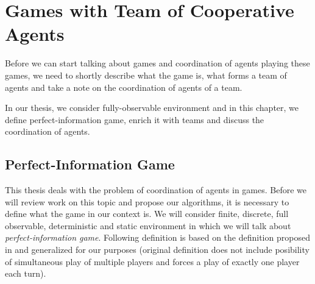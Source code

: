 \chapter{Games with Team of Cooperative Agents}
\label{chap_mas}

Before we can start talking about games and coordination of agents playing these games, we need
to shortly describe what the game is, what forms a team of agents and take a note on the
coordination of agents of a team. 

In our thesis, we consider fully-observable environment and
in this chapter, we define perfect-information game, enrich it with teams and discuss the
coordination of agents.


\section{Perfect-Information Game}


\label{sec_perfect_information_game}


This thesis deals with the problem of coordination of agents in games. Before we will review
work on this topic and propose our algorithms, it is necessary to define what the game in our
context is. We will consider finite, discrete, full observable, deterministic and static
environment in which we will talk about \emph{perfect-information game}. Following definition
is based on the definition
proposed in \cite{MAS2008} and generalized for our purposes (original definition does not
include posibility of simultaneous play of multiple players and forces a play of exactly one
player each turn).


